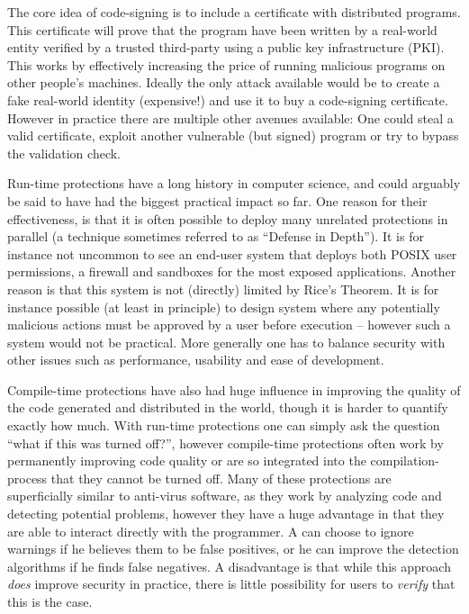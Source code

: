 The core idea of code-signing is to include a certificate with distributed
programs. This certificate will prove that the program have been written by a
real-world entity verified by a trusted third-party using a public key
infrastructure (PKI). This works by effectively increasing the price of running
malicious programs on other people's machines. Ideally the only attack available
would be to create a fake real-world identity (expensive!) and use it to buy a
code-signing certificate. However in practice there are multiple other avenues
available: One could steal a valid certificate, exploit another vulnerable (but
signed) program or try to bypass the validation check.

Run-time protections have a long history in computer science, and could arguably
be said to have had the biggest practical impact so far. One reason for their
effectiveness, is that it is often possible to deploy many unrelated protections
in parallel (a technique sometimes referred to as ``Defense in Depth''). It is
for instance not uncommon to see an end-user system that deploys both POSIX user
permissions, a firewall and sandboxes for the most exposed applications. Another
reason is that this system is not (directly) limited by Rice's Theorem. It is
for instance possible (at least in principle) to design system where any
potentially malicious actions must be approved by a user before execution --
however such a system would not be practical. More generally one has to balance
security with other issues such as performance, usability and ease of
development.

Compile-time protections have also had huge influence in improving the quality
of the code generated and distributed in the world, though it is harder to
quantify exactly how much. With run-time protections one can simply ask the
question ``what if this was turned off?'', however compile-time protections
often work by permanently improving code quality or are so integrated into the
compilation-process that they cannot be turned off. Many of these protections
are superficially similar to anti-virus software, as they work by analyzing code
and detecting potential problems, however they have a huge advantage in that
they are able to interact directly with the programmer. A can choose to ignore
warnings if he believes them to be false positives, or he can improve the
detection algorithms if he finds false negatives. A disadvantage is that while
this approach \emph{does} improve security in practice, there is little
possibility for users to \emph{verify} that this is the case.

